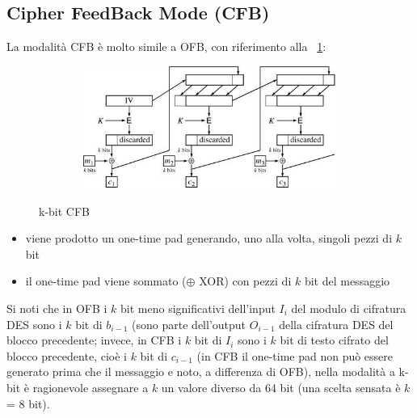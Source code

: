\subsection{Cipher FeedBack Mode (CFB)}
La modalità CFB è molto simile a OFB, con riferimento alla \figurename ~\ref{fig:k-bit_CFB}:
\begin{figure}[htbp]
	\centering%
	\subfigure%
	{\includegraphics[height=4cm, width=12cm, keepaspectratio]{Immagini/Capitolo3/k-bit_CFB.png}}
	\caption{k-bit CFB \label{fig:k-bit_CFB}} 	
\end{figure}
\begin{itemize}
\item viene prodotto un one-time pad generando, uno alla volta, singoli pezzi di $k$ bit
\item il one-time pad viene sommato ($\oplus$ XOR) con pezzi di $k$ bit del messaggio
\end{itemize}
Si noti che in OFB i $k$ bit meno significativi dell'input $I_{i}$ del modulo di cifratura DES sono i $k$ bit di $b_{i-1}$ (sono parte dell'output $O_{i-1}$ della cifratura DES del blocco precedente; invece, in CFB i $k$ bit di $I_{i}$ sono i $k$ bit di testo cifrato del blocco precedente, cioè i $k$ bit di $c_{i-1}$ (in CFB il one-time pad non può essere generato prima che il messaggio e noto, a differenza di OFB), nella modalità a k-bit è ragionevole assegnare a $k$ un valore diverso da 64 bit (una scelta sensata è $k$ = 8 bit).
